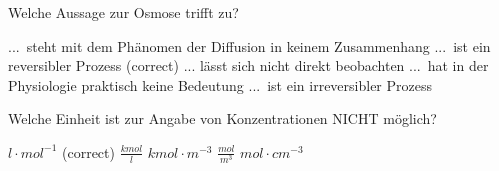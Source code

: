 \documentclass[11pt]{exam}
\begin{document}
\begin{questions}
\vspace{3mm}\question Welche Aussage zur Osmose trifft zu?

\begin{choices}
	\choice ... steht mit dem Phänomen der Diffusion in keinem Zusammenhang
	\choice ... ist ein reversibler Prozess (correct)
	\choice ... lässt sich nicht direkt beobachten
	\choice ... hat in der Physiologie praktisch keine Bedeutung
	\choice ... ist ein irreversibler Prozess
\end{choices}

\vspace{3mm}\question Welche Einheit ist zur Angabe von Konzentrationen NICHT möglich?

\begin{choices}
	\choice \( l \cdot mol^{-1} \) (correct)
	\choice \( \frac{kmol}{l} \)
	\choice \( kmol \cdot m^{-3} \)
	\choice \( \frac{mol}{m^3} \)
	\choice \( mol \cdot cm^{-3} \)
\end{choices}

\vspace{3mm}\end{questions}
\end{document}
